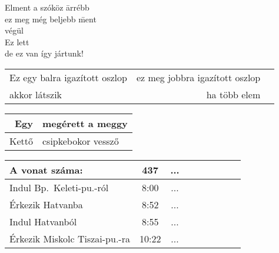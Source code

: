 \documentclass[a4paper]{article}
\begin{document}
\begin{tabbing}
Elment a szóköz \= arrébb\\
\> ez meg még beljebb \= ment\\
\> \> végül \\
Ez lett \=\\
\> de ez van \> így jártunk!
\end{tabbing}

\begin{tabular}{|lrc|}
Ez egy balra igazított oszlop & ez meg jobbra igazított oszlop
\\
akkor látszik & ha több elem
\end{tabular}

\begin{tabular}{|r|l|}
\hline
Egy & megérett a meggy \\
\hline
Kettő & csipkebokor vessző \\
\hline
\end{tabular} 

\begin{tabular}{|l||*8{c|}}
\hline
A vonat száma: & 437 & ... \\
\hline\hline
Indul Bp.\ Keleti-pu.-ról & 8:00 & ... \\
Érkezik Hatvanba & 8:52 & ... \\
Indul Hatvanból & 8:55 & ... \\
Érkezik Miskolc Tiszai-pu.-ra & 10:22 & ... \\
\hline
\end{tabular}
\end{document}
